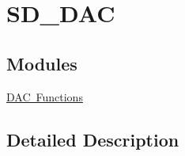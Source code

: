 \hypertarget{group___s_d___d_a_c}{}\section{S\+D\+\_\+\+D\+AC}
\label{group___s_d___d_a_c}
\subsection*{Modules}
\begin{DoxyCompactItemize}
\item 
\mbox{\hyperlink{group___s_d___d_a_c___functions}{D\+A\+C Functions}}
\end{DoxyCompactItemize}


\subsection{Detailed Description}
